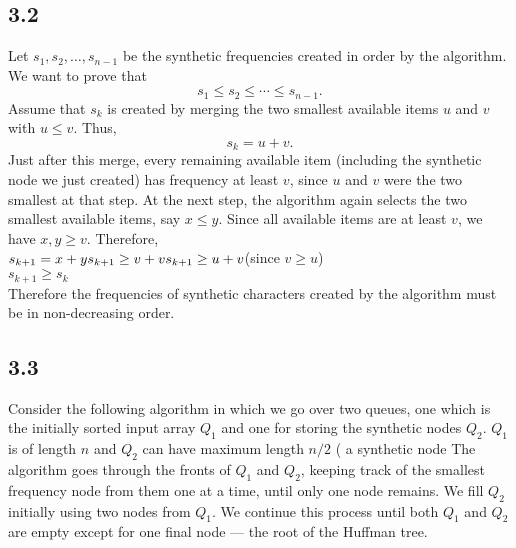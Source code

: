 \documentclass{article}[12pt]
\begin{document}
\subsection*{3.2} Let $s_1, s_2, \dots, s_{n-1}$ be the synthetic frequencies created in order by the algorithm. 
We want to prove that
\[
s_1 \le s_2 \le \cdots \le s_{n-1}.
\]
Assume that $s_k$ is created by merging the two smallest available items $u$ and $v$ with $u \le v$. 
Thus,
\[
s_k = u + v.
\]
Just after this merge, every remaining available item (including the synthetic node we just created) has frequency at least $v$, since $u$ and $v$ were the two smallest at that step.
At the next step, the algorithm again selects the two smallest available items, say $x \le y$. 
Since all available items are at least $v$, we have $x, y \ge v$. Therefore, \\
$s_{k+1} = x + y \\
s_{k+1} \ge v + v \\ 
s_{k+1} \ge u + v   $(since $v \ge u$) \\
$s_{k+1} \ge s_k$ \\
Therefore the frequencies of synthetic characters created by the algorithm must be in non-decreasing order. 
\subsection*{3.3}
Consider the following algorithm in which we go over two queues, one which is the initially sorted input array $Q_1$ and one for storing the synthetic nodes $Q_2$. $Q_1$ is of length $n$ and $Q_2$ can have maximum length $n/2$ ( a synthetic node 
The algorithm goes through the fronts of $Q_1$ and $Q_2$, keeping track of the smallest frequency node from them one at a time, until only one node remains. We fill $Q_2$ initially using two nodes from $Q_1$. We continue this process until both $Q_1$ and $Q_2$ are empty except for one final node — the root of the Huffman tree. \\
\end{document}
